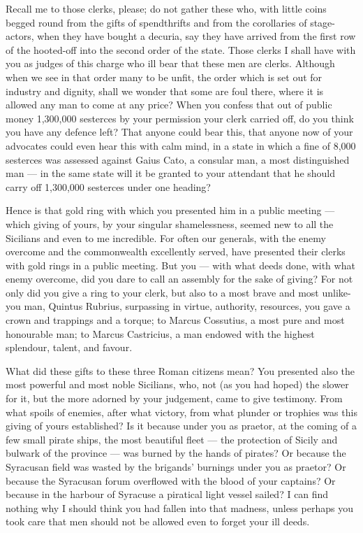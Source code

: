  Recall me to those clerks, please; do not gather these who, with little coins begged round from the gifts of spendthrifts and from the corollaries of stage-actors, when they have bought a decuria, say they have arrived from the first row of the hooted-off into the second order of the state. Those clerks I shall have with you as judges of this charge who ill bear that these men are clerks. Although when we see in that order many to be unfit, the order which is set out for industry and dignity, shall we wonder that some are foul there, where it is allowed any man to come at any price? When you confess that out of public money 1,300,000 sesterces by your permission your clerk carried off, do you think you have any defence left? That anyone could bear this, that anyone now of your advocates could even hear this with calm mind, in a state in which a fine of 8,000 sesterces was assessed against Gaius Cato, a consular man, a most distinguished man --- in the same state will it be granted to your attendant that he should carry off 1,300,000 sesterces under one heading?

 Hence is that gold ring with which you presented him in a public meeting --- which giving of yours, by your singular shamelessness, seemed new to all the Sicilians and even to me incredible. For often our generals, with the enemy overcome and the commonwealth excellently served, have presented their clerks with gold rings in a public meeting. But you --- with what deeds done, with what enemy overcome, did you dare to call an assembly for the sake of giving? For not only did you give a ring to your clerk, but also to a most brave and most unlike-you man, Quintus Rubrius, surpassing in virtue, authority, resources, you gave a crown and trappings and a torque; to Marcus Cossutius, a most pure and most honourable man; to Marcus Castricius, a man endowed with the highest splendour, talent, and favour.

 What did these gifts to these three Roman citizens mean? You presented also the most powerful and most noble Sicilians, who, not (as you had hoped) the slower for it, but the more adorned by your judgement, came to give testimony. From what spoils of enemies, after what victory, from what plunder or trophies was this giving of yours established? Is it because under you as praetor, at the coming of a few small pirate ships, the most beautiful fleet --- the protection of Sicily and bulwark of the province --- was burned by the hands of pirates? Or because the Syracusan field was wasted by the brigands' burnings under you as praetor? Or because the Syracusan forum overflowed with the blood of your captains? Or because in the harbour of Syracuse a piratical light vessel sailed? I can find nothing why I should think you had fallen into that madness, unless perhaps you took care that men should not be allowed even to forget your ill deeds.

